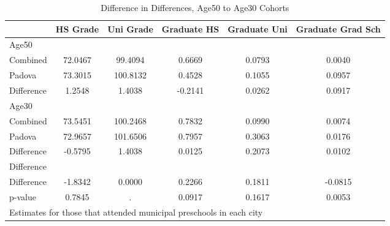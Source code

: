 \begin{table}[htbp]\centering
\caption{Difference in Differences, Age50 to Age30 Cohorts}
\begin{tabular}{l*{5}{c}}
\hline\hline
            &    HS Grade&   Uni Grade& Graduate HS&Graduate Uni&Graduate Grad Sch\\
\hline
Age50       &            &            &            &            &            \\
Combined    &     72.0467&     99.4094&      0.6669&      0.0793&      0.0040\\
Padova      &     73.3015&    100.8132&      0.4528&      0.1055&      0.0957\\
Difference  &      1.2548&      1.4038&     -0.2141&      0.0262&      0.0917\\
\hline
Age30       &            &            &            &            &            \\
Combined    &     73.5451&    100.2468&      0.7832&      0.0990&      0.0074\\
Padova      &     72.9657&    101.6506&      0.7957&      0.3063&      0.0176\\
Difference  &     -0.5795&      1.4038&      0.0125&      0.2073&      0.0102\\
\hline
Difference  &            &            &            &            &            \\
Difference  &     -1.8342&      0.0000&      0.2266&      0.1811&     -0.0815\\
p-value     &      0.7845&           .&      0.0917&      0.1617&      0.0053\\
\hline\hline
\multicolumn{6}{l}{\footnotesize Estimates for those that attended municipal preschools in each city}\\
\end{tabular}
\end{table}
